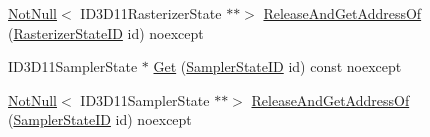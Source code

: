 \begin{DoxyCompactItemize}
\item 
\hyperlink{namespacemage_a8769f9d670d6b585ea306cb1062af94b}{Not\+Null}$<$ I\+D3\+D11\+Rasterizer\+State $\ast$$\ast$$>$ \hyperlink{classmage_1_1rendering_1_1_state_manager_afaeb70f484456bb8f24d3eb3e0d716c7}{Release\+And\+Get\+Address\+Of} (\hyperlink{namespacemage_1_1rendering_ac878731f5dc22a3a36ccfbfc77c3faca}{Rasterizer\+State\+ID} id) noexcept
\item 
I\+D3\+D11\+Sampler\+State $\ast$ \hyperlink{classmage_1_1rendering_1_1_state_manager_aa11a2d48ab33489c3ea635950d95e5a7}{Get} (\hyperlink{namespacemage_1_1rendering_a6f80181126db61dbb8b528a6894eb658}{Sampler\+State\+ID} id) const noexcept
\item 
\hyperlink{namespacemage_a8769f9d670d6b585ea306cb1062af94b}{Not\+Null}$<$ I\+D3\+D11\+Sampler\+State $\ast$$\ast$$>$ \hyperlink{classmage_1_1rendering_1_1_state_manager_a92f3776811c844924afb92f69284b9d3}{Release\+And\+Get\+Address\+Of} (\hyperlink{namespacemage_1_1rendering_a6f80181126db61dbb8b528a6894eb658}{Sampler\+State\+ID} id) noexcept
\end{DoxyCompactItemize}

